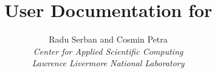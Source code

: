 \documentclass[twoside,openright,10pt]{report}
\title{User Documentation for {\ida} {\idarelease}}
\author{
  Radu Serban and Cosmin Petra\\
  {\em Center for Applied Scientific Computing} \\
  {\em Lawrence Livermore National Laboratory}
}
\date{
  \today 
  \vfill 
  {\centerline{\psfig{figure=doc_logo.eps,width=0.5\textwidth}}}
  \vfill \idaucrlug
}
\begin{document}
\frontug
\renewcommand{\chaptermark}[1]{\markboth{#1}{}}
\renewcommand{\sectionmark}[1]{\markright{\thesection\ #1}}


\clearemptydoublepage

\clearemptydoublepage

\clearemptydoublepage

\clearemptydoublepage

\clearemptydoublepage

\clearemptydoublepage

\clearemptydoublepage

\clearemptydoublepage

\clearemptydoublepage

\clearemptydoublepage

\clearemptydoublepage


\clearemptydoublepage
\printindex
\clearemptydoublepage
\end{document}
